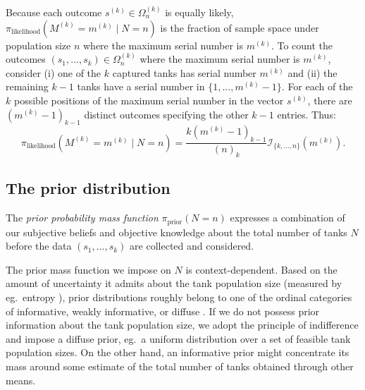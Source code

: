 \documentclass[11pt, oneside]{article}
\newcommand{\data}{$(s_1, ..., s_k)$\xspace}
\begin{document}
Because each outcome $s^{(k)}\in \Omega_n^{(k)}$ is equally likely, $\pi_{\text{likelihood}}(M^{(k)}=m^{(k)} \mid N=n)$ is the fraction of sample space under population size $n$ where the maximum serial number is $m^{(k)}$.
To count the outcomes $(s_1, ..., s_k)\in\Omega_n^{(k)}$ where the maximum serial number is $m^{(k)}$, consider (i) one of the $k$ captured tanks has serial number $m^{(k)}$ and (ii) the remaining $k-1$ tanks have a serial number in $\{1, ..., m^{(k)}-1\}$.
For each of the $k$ possible positions of the maximum serial number in the vector $s^{(k)}$, there are $(m^{(k)}-1)_{k-1}$ distinct outcomes specifying the other $k-1$ entries.
Thus:
\begin{equation}
	\pi_{\text{likelihood}}(M^{(k)}=m^{(k)} \mid N=n)=
	\dfrac{k(m^{(k)}-1)_{k-1}}{(n)_k} \mathcal{I}_{\{k,...,n\}}(m^{(k)}). \label{eq:likelihood_m}
 \end{equation}
 
\subsection{The prior distribution}
The \emph{prior probability mass function} $\pi_{\text{prior}}(N=n)$ expresses a combination of our subjective beliefs and objective knowledge about the total number of tanks $N$ before the data \data are collected and considered. 

The prior mass function we impose on $N$ is context-dependent. 
Based on the amount of uncertainty it admits about the tank population size (measured by eg.\ entropy \cite{murphy2022probabilistic}),
prior distributions roughly belong to one of the ordinal categories of informative, weakly informative, or diffuse \cite{van2021bayesian}.
If we do not possess prior information about the tank population size, we adopt the principle of indifference and impose a diffuse prior, eg.\ a uniform distribution over a set of feasible tank population sizes. 
On the other hand, an informative prior might concentrate its mass around some estimate of the total number of tanks obtained through other means. 
\end{document}
